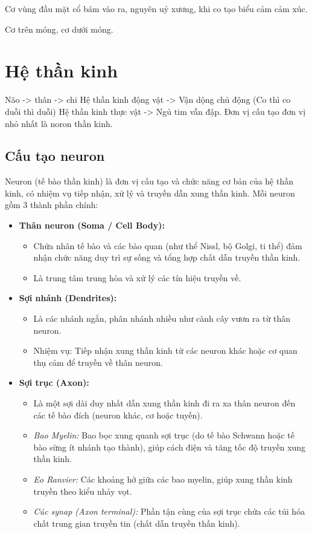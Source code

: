 Cơ vùng đầu mặt cổ bám vào ra, nguyên uỷ xương, khi co tạo biểu cảm cảm xúc.

Cơ trên móng, cơ dưới móng.

\section{Hệ thần kinh}
Não -> thân -> chi
Hệ thần kinh động vật -> Vận dộng chủ động (Co thì co duỗi thì duỗi)
Hệ thần kinh thực vật -> Ngủ tim vẫn đập.
Đơn vị cấu tạo đơn vị nhỏ nhất là noron thần kinh.

\subsection{Cấu tạo neuron}

Neuron (tế bào thần kinh) là đơn vị cấu tạo và chức năng cơ bản của hệ thần kinh, có nhiệm vụ tiếp nhận, xử lý và truyền dẫn xung thần kinh. Mỗi neuron gồm 3 thành phần chính:

\begin{itemize}
    \item \textbf{Thân neuron (Soma / Cell Body):} 
    \begin{itemize}
        \item Chứa nhân tế bào và các bào quan (như thể Nissl, bộ Golgi, ti thể) đảm nhận chức năng duy trì sự sống và tổng hợp chất dẫn truyền thần kinh.
        \item Là trung tâm trung hòa và xử lý các tín hiệu truyền về.
    \end{itemize}

    \item \textbf{Sợi nhánh (Dendrites):} 
    \begin{itemize}
        \item Là các nhánh ngắn, phân nhánh nhiều như cành cây vươn ra từ thân neuron.
        \item Nhiệm vụ: Tiếp nhận xung thần kinh từ các neuron khác hoặc cơ quan thụ cảm để truyền về thân neuron.
    \end{itemize}

    \item \textbf{Sợi trục (Axon):} 
    \begin{itemize}
        \item Là một sợi dài duy nhất dẫn xung thần kinh đi ra xa thân neuron đến các tế bào đích (neuron khác, cơ hoặc tuyến).
        \item \textit{Bao Myelin:} Bao bọc xung quanh sợi trục (do tế bào Schwann hoặc tế bào sừng ít nhánh tạo thành), giúp cách điện và tăng tốc độ truyền xung thần kinh.
        \item \textit{Eo Ranvier:} Các khoảng hở giữa các bao myelin, giúp xung thần kinh truyền theo kiểu nhảy vọt.
        \item \textit{Cúc synap (Axon terminal):} Phần tận cùng của sợi trục chứa các túi hóa chất trung gian truyền tin (chất dẫn truyền thần kinh).
    \end{itemize}
\end{itemize}

